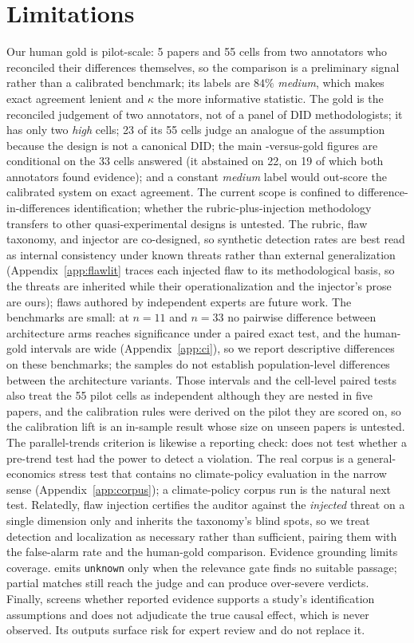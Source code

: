 \section*{Limitations}
\label{sec:limitations}

Our human gold is pilot-scale: 5 papers and 55 cells from two annotators who
reconciled their differences themselves, so the comparison is a preliminary
signal rather than a calibrated benchmark; its labels are $84\%$ \emph{medium},
which makes exact agreement lenient and $\kappa$ the more informative statistic.
The gold is the reconciled judgement of two annotators, not of a panel of DID
methodologists; it has only two \emph{high} cells; 23 of its 55 cells judge an
analogue of the assumption because the design is not a canonical DID; the main
\sys{}-versus-gold figures are conditional on the 33 cells \sys{} answered (it abstained
on 22, on 19 of which both annotators found evidence); and a constant
\emph{medium} label would out-score the calibrated system on exact agreement. The current scope is confined to
difference-in-differences identification; whether the rubric-plus-injection
methodology transfers to other quasi-experimental designs is untested. The rubric,
flaw taxonomy, and injector are co-designed, so synthetic detection rates are best
read as internal consistency under known threats rather than external
generalization (Appendix~\ref{app:flawlit} traces each injected flaw to its
methodological basis, so the threats are inherited while their
operationalization and the injector's prose are ours); flaws authored by independent experts are future
work. The benchmarks are small: at $n{=}11$ and $n{=}33$ no pairwise difference
between architecture arms reaches significance under a paired exact test, and
the human-gold intervals are wide (Appendix~\ref{app:ci}), so we report
descriptive differences on these benchmarks; the samples do not establish
population-level differences between the architecture variants. Those intervals and the
cell-level paired tests also treat the 55 pilot cells as independent although
they are nested in five papers, and the calibration rules were derived on the
pilot they are scored on, so the calibration lift is an in-sample result whose
size on unseen papers is untested. The parallel-trends criterion is likewise a
reporting check: \sys{} does not test whether a pre-trend test had the power to
detect a violation. The real corpus is a
general-economics stress test that contains no climate-policy evaluation in
the narrow sense (Appendix~\ref{app:corpus}); a climate-policy corpus run is
the natural next test. Relatedly,
flaw injection certifies the auditor against the \emph{injected} threat on a
single dimension only and inherits the taxonomy's blind spots, so we treat
detection and localization as necessary rather than sufficient, pairing them with
the false-alarm rate and the human-gold comparison. Evidence
grounding limits coverage. \sys{} emits \texttt{unknown} only when the relevance
gate finds no suitable passage; partial matches still reach the judge and can
produce over-severe verdicts. Finally, \sys{}
screens whether reported evidence supports a
study's identification assumptions and does not adjudicate the true causal effect,
which is never observed. Its outputs surface risk for expert review and do
not replace it.
